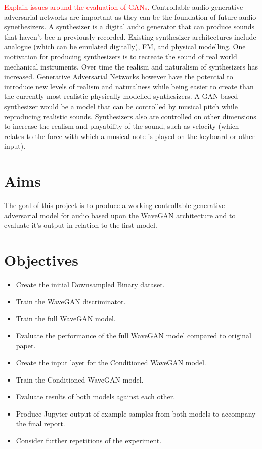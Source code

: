 \documentclass[titlepage]{article}
\begin{document}
\newline
\textcolor{red}{
  Explain issues around the evaluation of GANs.
}
\newline
\newline
Controllable audio generative adversarial networks are important as they can be the foundation of future audio synethesizers.
A synthesizer is a digital audio generator that can produce sounds that haven't bee n previously recorded.
Existing synthesizer architectures include analogue (which can be emulated digitally), FM, and physical modelling.
One motivation for producing synthesizers is to recreate the sound of real world mechanical instruments.
Over time the realism and naturalism of synthesizers has increased.
Generative Adversarial Networks however have the potential to introduce new levels of realism and naturalness while being easier to create than the currently most-realistic physically modelled synthesizers.
\newline
\newline
A GAN-based synthesizer would be a model that can be controlled by musical pitch while reproducing realistic sounds.
Synthesizers also are controlled on other dimensions to increase the realism and playability of the sound, such as velocity (which relates to the force with which a musical note is played on the keyboard or other input).

\section{Aims}

The goal of this project is to produce a working controllable generative adversarial model for audio based upon the WaveGAN architecture and to evaluate it's output in relation to the first model.

\section{Objectives}

\begin{itemize}
\item Create the initial Downsampled Binary dataset.
\item Train the WaveGAN discriminator.
\item Train the full WaveGAN model.
\item Evaluate the performance of the full WaveGAN model compared to original paper.
\item Create the input layer for the Conditioned WaveGAN model.
\item Train the Conditioned WaveGAN model.
\item Evaluate results of both models against each other.
\item Produce Jupyter output of example samples from both models to accompany the final report.
\item Consider further repetitions of the experiment.
\end{itemize}
\end{document}
